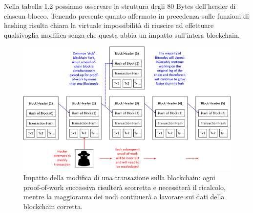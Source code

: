 \begin{table}[ht]
	\centering
\caption{Struttura dell'header di un blocco Bitcoin (documentazione ufficiale bitcoin.org)}
\end{table}


Nella tabella 1.2 possiamo osservare la struttura degli 80 Bytes dell’header di ciascun blocco. Tenendo presente quanto affermato in precedenza sulle funzioni di hashing risulta chiara la virtuale impossibilità di riuscire ad effettuare qualsivoglia modifica senza che questa abbia un impatto sull’intera blockchain.

\begin{figure}
	\centering
	\includegraphics[width=1.0\linewidth]{images/blockchain-diagram}
	\caption{Impatto della modifica di una transazione sulla blockchain: ogni proof-of-work successiva risulterà scorretta e necessiterà il ricalcolo, mentre la maggioranza dei nodi continuerà a lavorare sui dati della blockchain corretta.}
	\label{fig:blockchain-diagram}
\end{figure}



